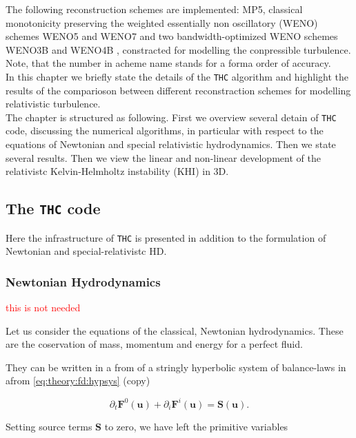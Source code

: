 \documentclass[11pt,a4paper,headinclude=true,DIV=14,BCOR=8mm,chapterprefix,listof=totoc,twoside,openright,abstracton]{scrbook}
\begin{document}
The following reconstruction schemes are implemented: MP5, classical monotonicity preserving \cite{Suresh:1997,Mignone:2010} the weighted essentially non oscillatory (WENO) schemes WENO5 and WENO7 \cite{Liu:1994,Jiang:1996,Shu:1997} and two bandwidth-optimized WENO schemes WENO3B and WENO4B \cite{Martin:2006,Taylor:2007}, constracted for modelling the conpressible turbulence. Note, that the number in acheme name stands for a forma order of accuracy. \\ 

In this chapter we briefly state the details of the \texttt{THC} algorithm and highlight the results of the comparioson between different reconstraction schemes for modelling relativistic turbulence. \\

The chapter is structured as following. First we overview several detain of \texttt{THC} code, discussing the numerical algorithms, in particular with respect to the equations of Newtonian and special relativistic hydrodynamics. Then we state several results. Then we view the linear and non-linear development of the relativistc Kelvin-Helmholtz instability (KHI) in 3D. 

\subsection{The \texttt{THC} code }

Here the infrastructure of \texttt{THC} is presented in addition to the formulation of Newtonian and special-relativistc HD. 

\subsubsection{Newtonian Hydrodynamics}
\textcolor{red}{this is not needed}

Let us consider the equations of the classical, Newtonian hydrodynamics. These are the coservation of mass, momentum and energy for a perfect fluid. 

They can be written in a from of a stringly hyperbolic system of balance-laws in afrom \ref{eq:theory:fd:hypsys} (copy)

\begin{equation}
\partial_t\boldsymbol{F}^0(\boldsymbol{u}) + \partial_i\boldsymbol{F}^i(\boldsymbol{u}) = \boldsymbol{S}(\boldsymbol{u}).
\end{equation}

Setting source terms $\boldsymbol{S}$ to zero, we have left the primitive variables 
\end{document}
